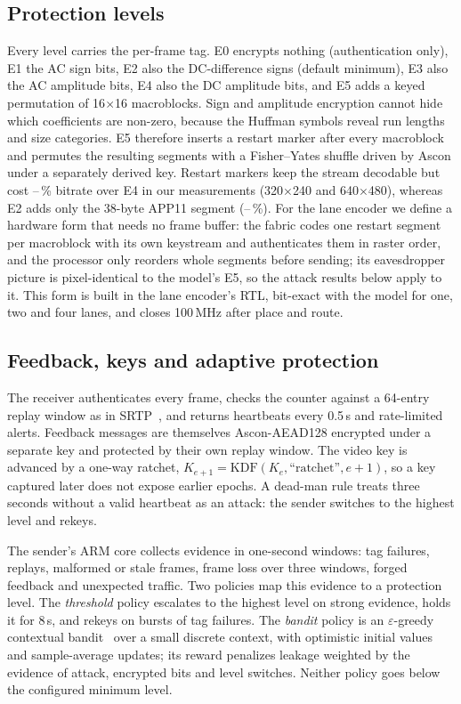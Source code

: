 \documentclass{ieeeaccess}
\newif\ifextended
\begin{document}
\subsection{Protection levels}
Every level carries the per-frame tag. E0 encrypts nothing (authentication only), E1 the AC sign bits, E2 also the DC-difference signs (default minimum), E3 also the AC amplitude bits, E4 also the DC amplitude bits, and E5 adds a keyed permutation of 16$\times$16 macroblocks. Sign and amplitude encryption cannot hide which coefficients are non-zero, because the Huffman symbols reveal run lengths and size categories. E5 therefore inserts a restart marker after every macroblock and permutes the resulting segments with a Fisher--Yates shuffle driven by Ascon under a separately derived key. Restart markers keep the stream decodable but cost \OverheadEfiveQVGA--\OverheadEfiveVGA\,\% bitrate over E4 in our measurements (320$\times$240 and 640$\times$480), whereas E2 adds only the \mbox{38-byte} APP11 segment (\OverheadEtwoVGA--\OverheadEtwoQVGA\,\%). For the lane encoder we define a hardware form that needs no frame buffer: the fabric codes one restart segment per macroblock with its own keystream and authenticates them in raster order, and the processor only reorders whole segments before sending\ifextended{} (the receiver undoes the order before checking the tag, so a moved segment fails it)\fi; its eavesdropper picture is pixel-identical to the model's E5, so the attack results below apply to it. This form is built in the lane encoder's RTL, bit-exact with the model for one, two and four lanes, and closes 100\,MHz after place and route.

\subsection{Feedback, keys and adaptive protection}
The receiver authenticates every frame, checks the counter against a 64-entry replay window as in SRTP~\cite{rfc3711}, and returns heartbeats every 0.5\,s and rate-limited alerts. Feedback messages are themselves Ascon-AEAD128 encrypted under a separate key and protected by their own replay window. The video key is advanced by a one-way ratchet, $K_{e+1}=\mathrm{KDF}(K_e,\textrm{``ratchet''},e{+}1)$, so a key captured later does not expose earlier epochs. A dead-man rule treats three seconds without a valid heartbeat as an attack: the sender switches to the highest level and rekeys.

The sender's ARM core collects evidence in one-second windows: tag failures, replays, malformed or stale frames, frame loss over three windows, forged feedback and unexpected traffic. Two policies map this evidence to a protection level. The \emph{threshold} policy escalates to the highest level on strong evidence, holds it for 8\,s, and rekeys on bursts of tag failures. The \emph{bandit} policy is an $\varepsilon$-greedy contextual bandit~\cite{sutton2018} over a small discrete context, with optimistic initial values and sample-average updates; its reward penalizes leakage weighted by the evidence of attack, encrypted bits and level switches. Neither policy goes below the configured minimum level.
\end{document}
